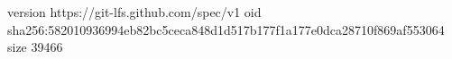 version https://git-lfs.github.com/spec/v1
oid sha256:582010936994eb82bc5ceca848d1d517b177f1a177e0dca28710f869af553064
size 39466
